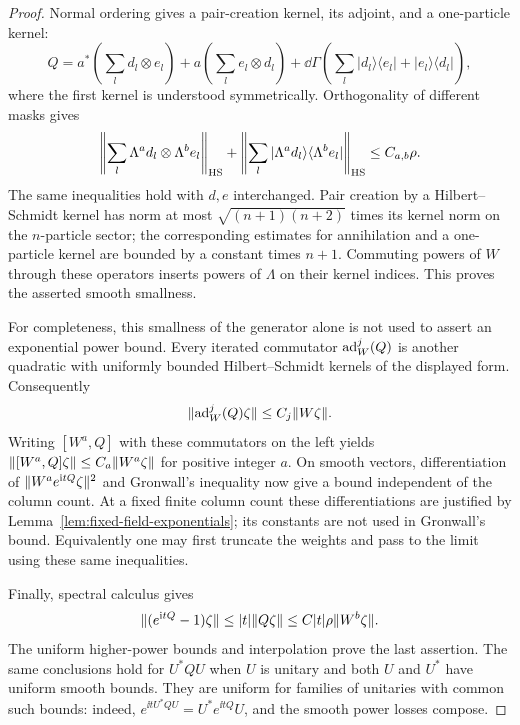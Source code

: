 \begin{proof}
Normal ordering gives a pair-creation kernel, its adjoint, and a
one-particle kernel:
\[
 Q=a^*(\textstyle\sum_l d_l\otimes e_l)
    +a(\textstyle\sum_l e_l\otimes d_l)
    +\dd\Gamma\!\left(\textstyle\sum_l
          |d_l\rangle\langle e_l|+|e_l\rangle\langle d_l|\right),
\]
where the first kernel is understood symmetrically.  Orthogonality of
different masks gives
\[
 \left\|\sum_l\Lambda^a d_l\otimes\Lambda^b e_l\right\|_{\rm HS}
 +\left\|\sum_l
       |\Lambda^a d_l\rangle\langle\Lambda^b e_l|\right\|_{\rm HS}
 \le C_{a,b}\rho.
\]
The same inequalities hold with \(d,e\) interchanged.  Pair creation
by a Hilbert--Schmidt kernel has norm at most
\(\sqrt{(n+1)(n+2)}\) times its kernel norm on the \(n\)-particle
sector; the corresponding estimates for annihilation and a
one-particle kernel are bounded by a constant times \(n+1\).
Commuting powers of \(W\) through these operators inserts powers of
\(\Lambda\) on their kernel indices.  This proves the asserted
smooth smallness.

For completeness, this smallness of the generator alone is not used
to assert an exponential power bound.  Every iterated commutator
\(\operatorname{ad}_W^j(Q)\) is another quadratic with uniformly bounded
Hilbert--Schmidt kernels of the displayed form.  Consequently
\[
 \lVert \operatorname{ad}_W^j(Q)\zeta\rVert\le C_j\lVert W\zeta\rVert.
\]
Writing \([W^a,Q]\) with these commutators on the left yields
\(\lVert [W^a,Q]\zeta\rVert\le C_a\lVert W^a\zeta\rVert\) for positive
integer \(a\).  On smooth vectors, differentiation of
\(\lVert W^ae^{\mathrm i tQ}\zeta\rVert^2\) and Gronwall's inequality now give
a bound independent of the column count.  At a fixed finite column
count these differentiations are justified by
Lemma~\ref{lem:fixed-field-exponentials}; its constants are not used
in Gronwall's bound.  Equivalently one may first truncate the weights
and pass to the limit using these same inequalities.

Finally, spectral calculus gives
\[
 \lVert (e^{\mathrm i tQ}-1)\zeta\rVert\le |t|\lVert Q\zeta\rVert
       \le C|t|\rho\lVert W^b\zeta\rVert.
\]
The uniform higher-power bounds and interpolation prove the last
assertion.  The same conclusions hold for \(U^*QU\) when \(U\) is
unitary and both \(U\) and \(U^*\) have uniform smooth bounds.  They
are uniform for families of unitaries with common such bounds: indeed,
\(e^{\ii tU^*QU}=U^*e^{\ii tQ}U\), and the smooth power losses
compose.
\end{proof}

